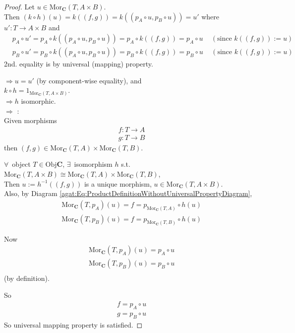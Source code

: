 \begin{proof}
	Let $u\in \text{Mor}_{\mathbf{C}}(T,A\times B)$. \\
	Then $(k\circ h)(u) = k((f, g)) = k((p_A \circ u, p_B \circ u))= u'$ where $u':T\to A\times B$ and \\
	\[
	\begin{aligned} 
	& p_A \circ u' = p_A \circ k((p_A \circ u, p_B \circ u)) = p_A \circ k ((f,g)) = p_A \circ u \quad \, (\text{since $k((f,g)) := u$}) \\
	& p_B \circ u' = p_B \circ k((p_A \circ u, p_B \circ u)) = p_B \circ k ((f,g)) = p_B \circ u \quad \, (\text{since $k((f,g)) := u$}) 
	\end{aligned} 
	\]
	2nd. equality is by universal (mapping) property.

$\Longrightarrow u= u'$ (by component-wise equality), and \\
$k\circ h = 1_{\text{Mor}_{\mathbf{C}}(T,A\times B)}$. \\
$\Longrightarrow h$ isomorphic. \\

$\Longrightarrow$ : \\

Given morphisms
\[
\begin{aligned}
& f:T \to A \\ 
& g:T \to B
\end{aligned}
\]
then $(f, g) \in \text{Mor}_{\mathbf{C}}(T, A) \times \text{Mor}_{\mathbf{C}}(T,B)$.

$\forall \, $ object $T\in \text{Obj}\mathbf{C}$, $\exists \, $ isomorphism $h$ s.t. $\text{Mor}_{\mathbf{C}}(T, A\times B) \cong \text{Mor}_{\mathbf{C}}(T,A) \times \text{Mor}_{\mathbf{C}}(T,B)$, \\
Then $u:=h^{-1}((f, g))$ is a unique morphism, $u\in \text{Mor}_{\mathbf{C}}(T, A\times B)$. \\
Also, by Diagram \ref{agat:Eq:ProductDefinitionWithoutUniversalPropertyDiagram}, 
\[
\begin{aligned}
& \text{Mor}_{\mathbf{C}}(T,p_A)(u) = f = p_{\text{Mor}_{\mathbf{C}}(T,A)} \circ h(u) \\ 
& \text{Mor}_{\mathbf{C}}(T,p_B)(u) = f = p_{\text{Mor}_{\mathbf{C}}(T,B)} \circ h(u) 
\end{aligned}
\]

Now
\[
\begin{aligned}
& \text{Mor}_{\mathbf{C}}(T, p_A)(u) = p_A \circ u \\
& \text{Mor}_{\mathbf{C}}(T, p_B)(u) = p_B \circ u \\
\end{aligned}
\]
(by definition).

So
\[
\begin{aligned} 
& f = p_A \circ u \\ 
& g = p_B \circ u
\end{aligned} 
\]
So universal mapping property is satisfied.
\end{proof}


